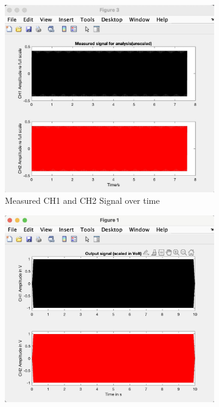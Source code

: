 \documentclass[
	a4paper,
	11pt,
]{article}
\begin{document}
\begin{figure}[htb!]
    \centering
        \begin{subfigure}[b]{0.45\textwidth}
        \centering
        \includegraphics[width=\textwidth]{2_img/2(a)_1.jpg}
        \caption[Measured CH1 and CH2 Signal over time]%
        {{\small  Measured CH1 and CH2 Signal over time }}    
        \label{fig:mean and std of net14}
    \end{subfigure}
    \hfill
    \centering
        \begin{subfigure}[b]{0.45\textwidth}
        \centering
        \includegraphics[width=\textwidth]{2_img/2(a)_2.jpg}

\end{subfigure}
\end{figure}
\end{document}

